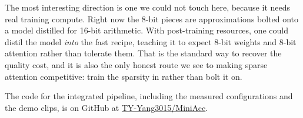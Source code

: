 The most interesting direction is one we could not touch here, because it needs real training compute. Right now the 8-bit pieces are approximations bolted onto a model distilled for 16-bit arithmetic. With post-training resources, one could distil the model \emph{into} the fast recipe, teaching it to expect 8-bit weights and 8-bit attention rather than tolerate them. That is the standard way to recover the quality cost, and it is also the only honest route we see to making sparse attention competitive: train the sparsity in rather than bolt it on.

The code for the integrated pipeline, including the measured configurations and the demo clips, is on GitHub at \href{https://github.com/TY-Yang3015/MiniAcc}{TY-Yang3015/MiniAcc}.
